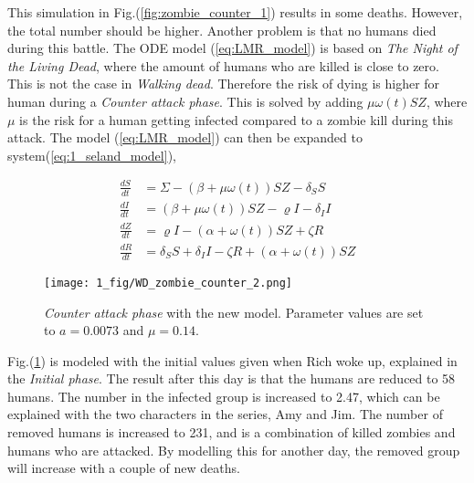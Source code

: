 \documentclass[%
twoside,                 %
final,                   %
chapterprefix=true,      %
open=right               %
10pt]{book}
\begin{document}
This simulation in Fig.(\ref{fig:zombie_counter_1}) results in some deaths. However, the total number should be higher. Another problem is that no humans died during this battle. The ODE model (\ref{eq:LMR_model}) is based on \emph{The Night of the Living Dead}, where the amount of humans who are killed is close to zero. This is not the case in \emph{Walking dead}. Therefore the risk of dying is higher for human during a \emph{Counter attack phase}. This is solved by adding $\mu \omega (t) SZ$, where $\mu$ is the risk for a human getting infected compared to a zombie kill during this attack. The model (\ref{eq:LMR_model}) can then be expanded to system(\ref{eq:1_seland_model}),

\begin{equation} \label{eq:1_seland_model}
	\begin{aligned} 
	\frac{dS}{dt} &= \Sigma -(\beta+\mu \omega(t))SZ - \delta_SS \\
	\frac{dI}{dt} &= (\beta+\mu \omega(t))SZ - \varrho I - \delta_II\\
	\frac{dZ}{dt} &= \varrho I- (\alpha+\omega(t))SZ + \zeta R\\
	\frac{dR}{dt} &= \delta_SS +\delta_II -\zeta R + (\alpha+\omega(t))SZ 
	\end{aligned}
\end{equation}


\begin{figure}[ht]
  \centerline{\texttt{[image: 1\_fig/WD\_zombie\_counter\_2.png]}}
  \caption{
  \label{fig:zombie_counter_2} \emph{Counter attack phase} with the new model. Parameter values are set to $a=0.0073$ and $\mu=0.14$.
  }
\end{figure}


Fig.(\ref{fig:zombie_counter_2}) is modeled with the initial values given when Rich woke up, explained in the \emph{Initial phase}. The result after this day is that the humans are reduced to 58 humans. The number in the infected group is increased to 2.47, which can be explained with the two characters in the series, Amy and Jim. The number of removed humans is increased to 231, and is a combination of killed zombies and humans who are attacked. By modelling this for another day, the removed group will increase with a couple of new deaths. 


\vspace{3mm}




\vspace{3mm}
\end{document}
